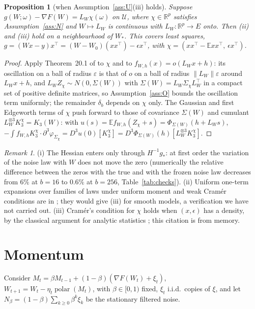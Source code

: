 \documentclass[10pt]{article}
\newtheorem{proposition}[theorem]{Proposition}
\theoremstyle{definition}
\theoremstyle{remark}
\newtheorem{remark}[theorem]{Remark}
\newcommand{\R}{\mathbb{R}}
\newcommand{\E}{\mathbb{E}}
\newcommand{\polar}{\operatorname{polar}}
\begin{document}
\begin{proposition}[when Assumption~\ref{ass:U}(iii) holds]\label{prop:lin}
Suppose $g(W;\omega)-\nabla F(W)=L_W\chi(\omega)$ on $\mathcal U$, where $\chi\in\R^p$ satisfies Assumption~\ref{ass:N}
and $W\mapsto L_W$ is continuous with $L_W:\R^p\to E$ onto. Then (ii) and (iii) hold on a neighbourhood of $W_\ast$.
This covers least squares, $g=(Wx-y)x^\top=(W-W_0)(xx^\top)-\epsilon x^\top$, with
$\chi=(xx^\top-\E xx^\top,\ \epsilon x^\top)$.
\end{proposition}
\begin{proof}
Apply Theorem~20.1 of \cite{br} to $\chi$ and to $f_{W,h}(x)=o(L_Wx+h)$: its oscillation on a ball of radius
$\varepsilon$ is that of $o$ on a ball of radius $\|L_W\|\varepsilon$ around $L_Wx+h$, and $L_WZ_\chi\sim
N(0,\Sigma(W))$ with $\Sigma(W)=L_W\Sigma_\chi L_W^\top$ in a compact set of positive definite matrices, so
Assumption~\ref{ass:O} bounds the oscillation term uniformly; the remainder $\delta_b$ depends on $\chi$ only. The
Gaussian and first Edgeworth terms of $\chi$ push forward to those of covariance $\Sigma(W)$ and cumulant
$L_W^{\otimes3}K_3^\chi=K_3(W)$: with $u(s)=\E f_{W,h}(Z_\chi+s)=\Phi_{\Sigma(W)}(h+L_Ws)$,
$-\int f_{W,h}K_3^\chi\cdot\partial^3\varphi_{\Sigma_\chi}=D^3u(0)[K_3^\chi]=D^3\Phi_{\Sigma(W)}(h)[L_W^{\otimes3}K_3^\chi]$.
\end{proof}

\begin{remark}
(i) The Hessian enters only through $H^{-1}g_\ast$: at first order the variation of the noise law with $W$ does not move
the zero (numerically the relative difference between the zeros with the true and with the frozen noise law decreases
from $6\%$ at $b=16$ to $0.6\%$ at $b=256$, Table~\ref{tab:checks}).
(ii) Uniform one-term expansions over families of laws under uniform moment and weak Cram\'er conditions are in
\cite{song}; they would give (iii) for smooth models, a verification we have not carried out. (iii) Cram\'er's condition
for $\chi$ holds when $(x,\epsilon)$ has a density, by the classical argument for analytic statistics \cite{bg}; this
citation is from memory.
\end{remark}

\section{Momentum}\label{sec:mom}

Consider $M_t=\beta M_{t-1}+(1-\beta)(\nabla F(W_t)+\xi_t)$, $W_{t+1}=W_t-\eta_t\polar(M_t)$, with $\beta\in[0,1)$ fixed,
$\xi_t$ i.i.d.\ copies of $\xi$, and let $N_\beta=(1-\beta)\sum_{k\ge0}\beta^k\xi_k$ be the stationary filtered noise.
\end{document}
